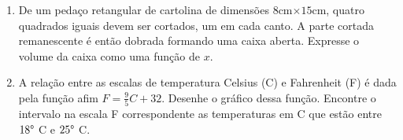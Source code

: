 \documentclass[a4paper,5pt]{amsbook}
\begin{document}
\begin{enumerate}
    \vspace{0.5cm}
    \item De um peda\c{c}o retangular de cartolina de dimens\~oes $8$cm$\times 15$cm,
        quatro quadrados iguais devem ser cortados, um em cada canto. A parte
        cortada remanescente \'e ent\~ao dobrada formando uma caixa aberta.
        Expresse o volume da caixa como uma fun\c{c}\~ao de $x$.

    \vspace{0.5cm}
    \item A rela\c{c}\~ao entre as escalas de temperatura Celsius (C) e Fahrenheit
        (F) \'e dada pela fun\c{c}\~ao afim $F=\displaystyle\frac{9}{5}C+32$. Desenhe o
        gr\'afico dessa fun\c{c}\~ao. Encontre o intervalo na escala F correspondente
        as temperaturas em C que est\~ao entre $18\degree$ C e $25\degree$ C.


\end{enumerate}
\end{document}

